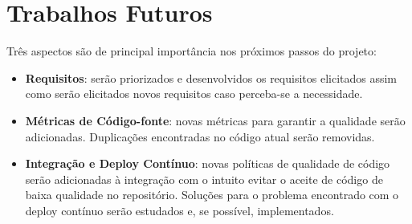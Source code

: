 \section{Trabalhos Futuros}

Três aspectos são de principal importância nos próximos passos do projeto:

\begin{itemize}
    \item \textbf{Requisitos}: serão priorizados e desenvolvidos os requisitos elicitados assim como serão elicitados novos requisitos caso perceba-se a necessidade.
    \item \textbf{Métricas de Código-fonte}: novas métricas para garantir a qualidade serão adicionadas. Duplicações encontradas no código atual serão removidas.
    \item \textbf{Integração e Deploy Contínuo}: novas políticas de qualidade de código serão adicionadas à integração com o intuito evitar o aceite de código de baixa qualidade no repositório. Soluções para o problema encontrado com o deploy contínuo serão estudados e, se possível, implementados.
\end{itemize}
